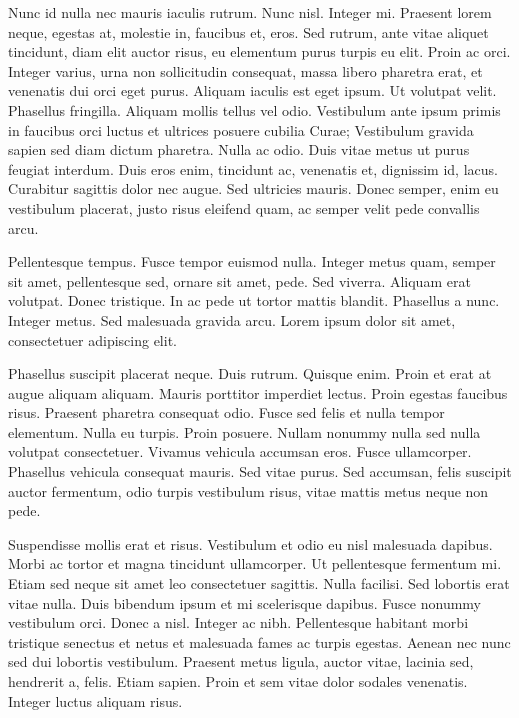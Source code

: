 \documentclass{article}
\begin{document}
Nunc id nulla nec mauris iaculis rutrum. Nunc nisl. Integer mi. Praesent
lorem neque, egestas at, molestie in, faucibus et, eros. Sed rutrum, ante vitae
aliquet tincidunt, diam elit auctor risus, eu elementum purus turpis eu elit.
Proin ac orci. Integer varius, urna non sollicitudin consequat, massa libero
pharetra erat, et venenatis dui orci eget purus. Aliquam iaculis est eget
ipsum. Ut volutpat velit. Phasellus fringilla. Aliquam mollis tellus vel odio.
Vestibulum ante ipsum primis in faucibus orci luctus et ultrices posuere
cubilia Curae; Vestibulum gravida sapien sed diam dictum pharetra. Nulla ac
odio. Duis vitae metus ut purus feugiat interdum. Duis eros enim, tincidunt ac,
venenatis et, dignissim id, lacus. Curabitur sagittis dolor nec augue. Sed
ultricies mauris. Donec semper, enim eu vestibulum placerat, justo risus
eleifend quam, ac semper velit pede convallis arcu.

Pellentesque tempus. Fusce tempor euismod nulla. Integer metus quam, semper
sit amet, pellentesque sed, ornare sit amet, pede. Sed viverra. Aliquam erat
volutpat. Donec tristique. In ac pede ut tortor mattis blandit. Phasellus a
nunc. Integer metus. Sed malesuada gravida arcu. Lorem ipsum dolor sit amet,
consectetuer adipiscing elit.

Phasellus suscipit placerat neque. Duis rutrum. Quisque enim. Proin et erat
at augue aliquam aliquam. Mauris porttitor imperdiet lectus. Proin egestas
faucibus risus. Praesent pharetra consequat odio. Fusce sed felis et nulla tempor
elementum. Nulla eu turpis. Proin posuere. Nullam nonummy nulla sed nulla
volutpat consectetuer. Vivamus vehicula accumsan eros. Fusce ullamcorper.
Phasellus vehicula consequat mauris. Sed vitae purus. Sed accumsan, felis
suscipit auctor fermentum, odio turpis vestibulum risus, vitae mattis metus
neque non pede.

Suspendisse mollis erat et risus. Vestibulum et odio eu nisl malesuada
dapibus. Morbi ac tortor et magna tincidunt ullamcorper. Ut pellentesque
fermentum mi. Etiam sed neque sit amet leo consectetuer sagittis. Nulla
facilisi. Sed lobortis erat vitae nulla. Duis bibendum ipsum et mi scelerisque
dapibus. Fusce nonummy vestibulum orci. Donec a nisl. Integer ac nibh.
Pellentesque habitant morbi tristique senectus et netus et malesuada fames ac
turpis egestas. Aenean nec nunc sed dui lobortis vestibulum. Praesent metus
ligula, auctor vitae, lacinia sed, hendrerit a, felis. Etiam sapien. Proin et
sem vitae dolor sodales venenatis. Integer luctus aliquam risus.
\end{document}
